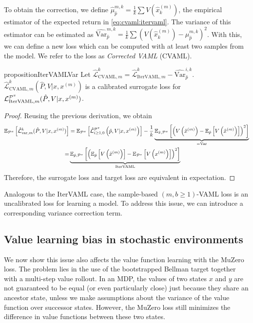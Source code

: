 To obtain the correction, we define $\hat{\mu}_{\hat{p}}^{m,k} = \frac{1}{k}\sum V(\hat{x}_k^{(m)})$, the empirical estimator of the expected return in \autoref{eq:cvaml:itervaml}.
The variance of this estimator can be estimated as $\widehat{\mathrm{Var}}_{\hat{p}}^{m,k} = \frac{1}{k} \sum (V(\hat{x}_k^{(m)}) - \mu_{\hat{p}}^{m,k})^2$.
With this, we can define a new loss which can be computed with at least two samples from the model.
We refer to the loss as \emph{Corrected VAML} (CVAML).

\begin{restatable}{proposition}{IterVAMLVar}\label{prop:cvaml:2_2}
    Let $\hat{\mathcal{L}}_{\mathrm{CVAML}, m}^{k} = \hat{\mathcal{L}}^k_{\mathrm{IterVAML}, m} - \widehat{\mathrm{Var}}_{\hat{p}}^{i,k}.$
    $\hat{\mathcal{L}}_{\mathrm{CVAML}, m}^{k}(\hat{P}, V|x, x^{(m)})$ is a calibrated surrogate loss for $\mathcal{L}_{\mathrm{IterVAML}, m}^{\P^\pi}(\hat{P}, V|x, x^{(m)})$.
\end{restatable}
\begin{proof}
Reusing the previous derivation, we obtain
\begin{align}
    \EEX{\P^\pi}{\hat{\mathcal{L}}_{\mathrm{var}, m}^{k}(\hat{P}, V|x, x^{(m)})} &= \EEX{\P^\pi}{\hat{\mathcal{L}}^{\P^\pi}_{i\geq1,0}\left(\hat{p},V|x,x^{(m)}\right)} - \frac{1}{k}\underbrace{\EEX{\hat{x},\P^\pi}{\left(V\left(\hat{x}^{(m)}\right) - \EEX{\hat{p}}{V\left(\hat{x}^{(m)}\right)}\right)^2}}_{= \mathrm{Var}}\\
    = & \underbrace{\EEX{\hat{p},\P^\pi}{\left(\EEX{\hat{p}}{V\left(\hat{x}^{(m)}\right)} - \EEX{\P^\pi}{V\left(x^{(m)}\right)}\right)^2}}_{\mathrm{IterVAML}}
\end{align}
Therefore, the surrogate loss and target loss are equivalent in expectation.
\end{proof}


Analogous to the IterVAML case, the sample-based $(m,b \geq 1)$-VAML loss is an uncalibrated loss for learning a model.
To address this issue, we can introduce a corresponding variance correction term.

\subsection{Value learning bias in stochastic environments}
\label{sec:cvaml:muzero_bias}

We now show this issue also affects the value function learning with the MuZero loss.
The problem lies in the use of the bootstrapped Bellman target together with a multi-step value rollout.
In an MDP, the values of two states $x$ and $y$ are not guaranteed to be equal (or even particularly close) just because they share an ancestor state, unless we make assumptions about the variance of the value function over successor states.
However, the MuZero loss still minimizes the difference in value functions between these two states.

